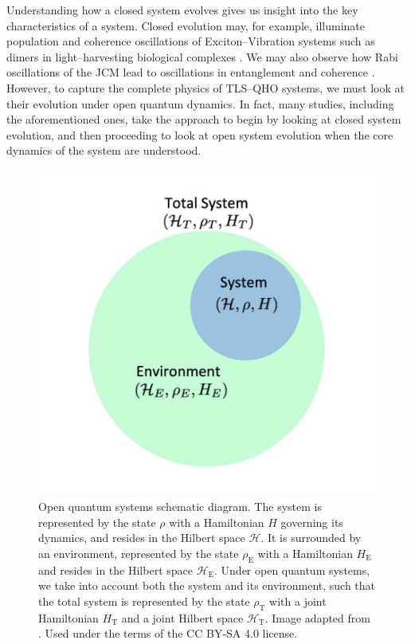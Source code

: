 \documentclass[11pt]{article}
\begin{document}
\noindent Understanding how a closed system evolves gives us insight into the key characteristics of a system. Closed evolution may, for example, illuminate population and coherence oscillations of Exciton--Vibration systems such as dimers in light--harvesting biological complexes \cite{ExVib2014-Alexandra}. We may also observe how Rabi oscillations of the JCM lead to oscillations in entanglement and coherence \cite{Entanglement2009-REE_VNapplied}. However, to capture the complete physics of TLS--QHO systems, we must look at their evolution under open quantum dynamics. In fact, many studies, including the aforementioned ones, take the approach to begin by looking at closed system evolution, and then proceeding to look at open system evolution when the core dynamics of the system are understood.\\

\begin{figure}[h]
    \centering
    \includegraphics[scale=0.55]{Images/open_q_sys.png}
    \caption{Open quantum systems schematic diagram. The system is represented by the state $\rho$ with a Hamiltonian $H$ governing its dynamics, and resides in the Hilbert space $\mathcal{H}$. It is surrounded by an environment, represented by the state $\rho_{\scriptscriptstyle \text{E}}$ with a Hamiltonian $H_{\scriptscriptstyle \text{E}}$ and resides in the Hilbert space $\mathcal{H}_{\scriptscriptstyle \text{E}}$. Under open quantum systems, we take into account both the system and its environment, such that the total system is represented by the state $\rho_{\scriptscriptstyle \text{T}}$ with a joint Hamiltonian $H_{\scriptscriptstyle \text{T}}$ and a joint Hilbert space $\mathcal{H}_{\scriptscriptstyle \text{T}}$. Image adapted from \cite{Image2020-OQS}. Used under the terms of the CC BY-SA 4.0
        license.}
    \label{fig:img_OQS}
\end{figure}\\
\end{document}
